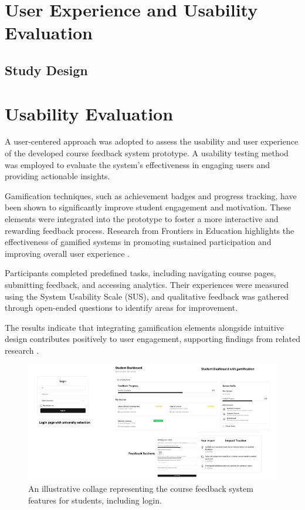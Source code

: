\documentclass[conference]{IEEEtran}
\begin{document}
\section{User Experience and Usability Evaluation}
\subsection{Study Design}

\section{Usability Evaluation}

A user-centered approach was adopted to assess the usability and user experience of the developed course feedback system prototype. A usability testing method was employed to evaluate the system's effectiveness in engaging users and providing actionable insights.

Gamification techniques, such as achievement badges and progress tracking, have been shown to significantly improve student engagement and motivation. These elements were integrated into the prototype to foster a more interactive and rewarding feedback process. Research from Frontiers in Education highlights the effectiveness of gamified systems in promoting sustained participation and improving overall user experience \cite{10.3389/feduc.2024.1466926}.

Participants completed predefined tasks, including navigating course pages, submitting feedback, and accessing analytics. Their experiences were measured using the System Usability Scale (SUS)\cite{brooke1996sus}, and qualitative feedback was gathered through open-ended questions to identify areas for improvement.

The results indicate that integrating gamification elements alongside intuitive design contributes positively to user engagement, supporting findings from related research \cite{10.3389/feduc.2024.1466926}.

\begin{figure}[!h]
    \centering
    \includegraphics[width=\textwidth]{features.png}
    \caption{An illustrative collage representing the course feedback system features for students, including login.}
    \label{fig:student_features}
\end{figure}
\end{document}
